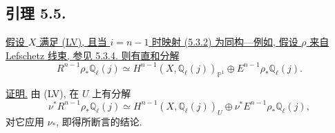 \subsection*{引理 5.5.}
\underline{假设 $X$ 满足 (LV), 且当 $i=n-1$ 时映射 (5.3.2) 为同构---例如, 假设 $\rho$ 来自 Lefschetz 线束, 参见 5.3.4. 则有直和分解}
\begin{equation}\tag{5.5.1}
R^{n-1}\rho_*\mathbb Q_\ell(j)
\simeq
H^{n-1}(X,\mathbb Q_\ell(j))_{\mathbb P^1}
\oplus E^{n-1}\rho_*\mathbb Q_\ell(j).
\end{equation}

\underline{证明.}
由 (LV), 在 $U$ 上有分解
\begin{equation}\tag{5.5.2}
\nu^*R^{n-1}\rho_*\mathbb Q_\ell(j)
\simeq
H^{n-1}(X,\mathbb Q_\ell(j))_U
\oplus \nu^*E^{n-1}\rho_*\mathbb Q_\ell(j),
\end{equation}
对它应用 $\nu_*$, 即得所断言的结论.
